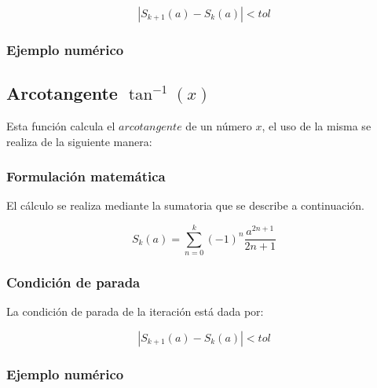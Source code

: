 \documentclass[10pt,a4paper]{article}
\begin{document}
	\begin{equation}\label{key9}
		\left\lvert S_{k+1}(a) - S_{k}(a) \right\lvert < tol
	\end{equation}
	
	\subsubsection{Ejemplo numérico}
	
	\subsection{Arcotangente $\tan^{-1}(x)$}
	
	Esta función calcula el $arcotangente$ de un número $x$, el uso de la misma se realiza de la siguiente manera:
	
	\begin{center}
	\end{center}
	
	\subsubsection{Formulación matemática}
	
	El cálculo se realiza mediante la sumatoria que se describe a continuación.
	
	\begin{equation}\label{key22}
		S_{k}(a) = \sum_{n=0}^{k}(-1)^{n}\frac{a^{2n+1}}{2n + 1}
	\end{equation}
	
	\subsubsection{Condición de parada}
	
	La condición de parada de la iteración está dada por: 
	
	\begin{equation}\label{key9}
		\left\lvert S_{k+1}(a) - S_{k}(a) \right\lvert < tol
	\end{equation}
	
	\subsubsection{Ejemplo numérico}
	
	
\end{document}

